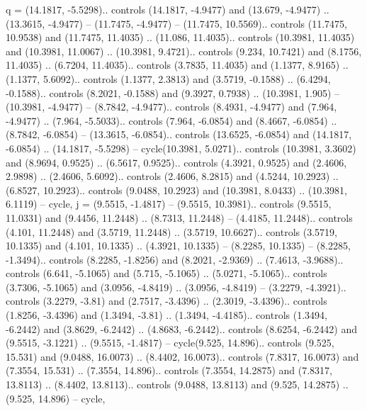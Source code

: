 {q} = {(14.1817, -5.5298).. controls (14.1817, -4.9477) and (13.679, -4.9477) .. (13.3615, -4.9477) -- (11.7475, -4.9477) -- (11.7475, 10.5569).. controls (11.7475, 10.9538) and (11.7475, 11.4035) .. (11.086, 11.4035).. controls (10.3981, 11.4035) and (10.3981, 11.0067) .. (10.3981, 9.4721).. controls (9.234, 10.7421) and (8.1756, 11.4035) .. (6.7204, 11.4035).. controls (3.7835, 11.4035) and (1.1377, 8.9165) .. (1.1377, 5.6092).. controls (1.1377, 2.3813) and (3.5719, -0.1588) .. (6.4294, -0.1588).. controls (8.2021, -0.1588) and (9.3927, 0.7938) .. (10.3981, 1.905) -- (10.3981, -4.9477) -- (8.7842, -4.9477).. controls (8.4931, -4.9477) and (7.964, -4.9477) .. (7.964, -5.5033).. controls (7.964, -6.0854) and (8.4667, -6.0854) .. (8.7842, -6.0854) -- (13.3615, -6.0854).. controls (13.6525, -6.0854) and (14.1817, -6.0854) .. (14.1817, -5.5298) -- cycle(10.3981, 5.0271).. controls (10.3981, 3.3602) and (8.9694, 0.9525) .. (6.5617, 0.9525).. controls (4.3921, 0.9525) and (2.4606, 2.9898) .. (2.4606, 5.6092).. controls (2.4606, 8.2815) and (4.5244, 10.2923) .. (6.8527, 10.2923).. controls (9.0488, 10.2923) and (10.3981, 8.0433) .. (10.3981, 6.1119) -- cycle},
{j} = {(9.5515, -1.4817) -- (9.5515, 10.3981).. controls (9.5515, 11.0331) and (9.4456, 11.2448) .. (8.7313, 11.2448) -- (4.4185, 11.2448).. controls (4.101, 11.2448) and (3.5719, 11.2448) .. (3.5719, 10.6627).. controls (3.5719, 10.1335) and (4.101, 10.1335) .. (4.3921, 10.1335) -- (8.2285, 10.1335) -- (8.2285, -1.3494).. controls (8.2285, -1.8256) and (8.2021, -2.9369) .. (7.4613, -3.9688).. controls (6.641, -5.1065) and (5.715, -5.1065) .. (5.0271, -5.1065).. controls (3.7306, -5.1065) and (3.0956, -4.8419) .. (3.0956, -4.8419) -- (3.2279, -4.3921).. controls (3.2279, -3.81) and (2.7517, -3.4396) .. (2.3019, -3.4396).. controls (1.8256, -3.4396) and (1.3494, -3.81) .. (1.3494, -4.4185).. controls (1.3494, -6.2442) and (3.8629, -6.2442) .. (4.8683, -6.2442).. controls (8.6254, -6.2442) and (9.5515, -3.1221) .. (9.5515, -1.4817) -- cycle(9.525, 14.896).. controls (9.525, 15.531) and (9.0488, 16.0073) .. (8.4402, 16.0073).. controls (7.8317, 16.0073) and (7.3554, 15.531) .. (7.3554, 14.896).. controls (7.3554, 14.2875) and (7.8317, 13.8113) .. (8.4402, 13.8113).. controls (9.0488, 13.8113) and (9.525, 14.2875) .. (9.525, 14.896) -- cycle},

